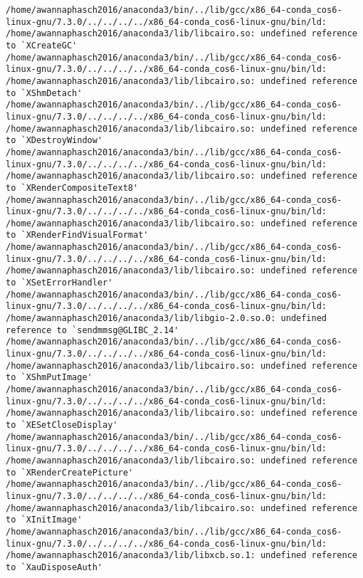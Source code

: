 \documentclass[11pt]{article}
\begin{document}
\begin{enumerate}
\begin{enumerate}
\begin{verbatim}
/home/awannaphasch2016/anaconda3/bin/../lib/gcc/x86_64-conda_cos6-linux-gnu/7.3.0/../../../../x86_64-conda_cos6-linux-gnu/bin/ld: /home/awannaphasch2016/anaconda3/lib/libcairo.so: undefined reference to `XCreateGC'
/home/awannaphasch2016/anaconda3/bin/../lib/gcc/x86_64-conda_cos6-linux-gnu/7.3.0/../../../../x86_64-conda_cos6-linux-gnu/bin/ld: /home/awannaphasch2016/anaconda3/lib/libcairo.so: undefined reference to `XShmDetach'
/home/awannaphasch2016/anaconda3/bin/../lib/gcc/x86_64-conda_cos6-linux-gnu/7.3.0/../../../../x86_64-conda_cos6-linux-gnu/bin/ld: /home/awannaphasch2016/anaconda3/lib/libcairo.so: undefined reference to `XDestroyWindow'
/home/awannaphasch2016/anaconda3/bin/../lib/gcc/x86_64-conda_cos6-linux-gnu/7.3.0/../../../../x86_64-conda_cos6-linux-gnu/bin/ld: /home/awannaphasch2016/anaconda3/lib/libcairo.so: undefined reference to `XRenderCompositeText8'
/home/awannaphasch2016/anaconda3/bin/../lib/gcc/x86_64-conda_cos6-linux-gnu/7.3.0/../../../../x86_64-conda_cos6-linux-gnu/bin/ld: /home/awannaphasch2016/anaconda3/lib/libcairo.so: undefined reference to `XRenderFindVisualFormat'
/home/awannaphasch2016/anaconda3/bin/../lib/gcc/x86_64-conda_cos6-linux-gnu/7.3.0/../../../../x86_64-conda_cos6-linux-gnu/bin/ld: /home/awannaphasch2016/anaconda3/lib/libcairo.so: undefined reference to `XSetErrorHandler'
/home/awannaphasch2016/anaconda3/bin/../lib/gcc/x86_64-conda_cos6-linux-gnu/7.3.0/../../../../x86_64-conda_cos6-linux-gnu/bin/ld: /home/awannaphasch2016/anaconda3/lib/libgio-2.0.so.0: undefined reference to `sendmmsg@GLIBC_2.14'
/home/awannaphasch2016/anaconda3/bin/../lib/gcc/x86_64-conda_cos6-linux-gnu/7.3.0/../../../../x86_64-conda_cos6-linux-gnu/bin/ld: /home/awannaphasch2016/anaconda3/lib/libcairo.so: undefined reference to `XShmPutImage'
/home/awannaphasch2016/anaconda3/bin/../lib/gcc/x86_64-conda_cos6-linux-gnu/7.3.0/../../../../x86_64-conda_cos6-linux-gnu/bin/ld: /home/awannaphasch2016/anaconda3/lib/libcairo.so: undefined reference to `XESetCloseDisplay'
/home/awannaphasch2016/anaconda3/bin/../lib/gcc/x86_64-conda_cos6-linux-gnu/7.3.0/../../../../x86_64-conda_cos6-linux-gnu/bin/ld: /home/awannaphasch2016/anaconda3/lib/libcairo.so: undefined reference to `XRenderCreatePicture'
/home/awannaphasch2016/anaconda3/bin/../lib/gcc/x86_64-conda_cos6-linux-gnu/7.3.0/../../../../x86_64-conda_cos6-linux-gnu/bin/ld: /home/awannaphasch2016/anaconda3/lib/libcairo.so: undefined reference to `XInitImage'
/home/awannaphasch2016/anaconda3/bin/../lib/gcc/x86_64-conda_cos6-linux-gnu/7.3.0/../../../../x86_64-conda_cos6-linux-gnu/bin/ld: /home/awannaphasch2016/anaconda3/lib/libxcb.so.1: undefined reference to `XauDisposeAuth'

\end{verbatim}
\end{enumerate}
\end{enumerate}
\end{document}
